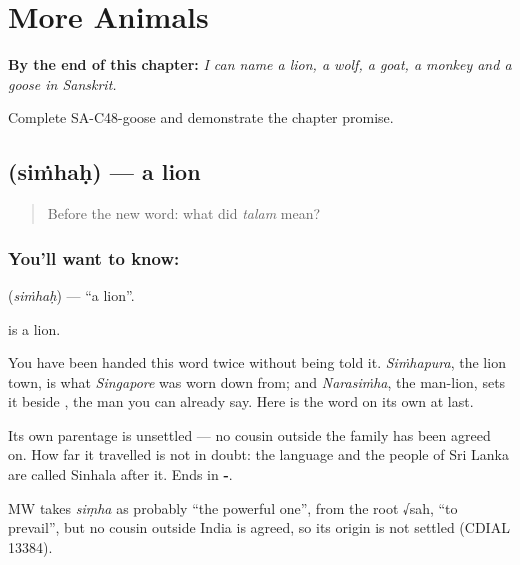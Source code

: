 
\chapter{More Animals}
\label{ch:sa-more-animals}

\begin{chapteropening}
\textbf{By the end of this chapter:} \emph{I can name a lion, a wolf, a goat, a monkey and a goose in Sanskrit.}

Complete SA-C48-goose and demonstrate the chapter promise.
\end{chapteropening}

\section[\texorpdfstring{\sk{सिंहः} (siṁhaḥ)}{सिंहः (siṁhaḥ)}]{ (siṁhaḥ) — a lion}

\label{lesson:SA-C48-lion}



\begin{quote}
Before the new word: what did \emph{talam} mean?
\end{quote}

\subsection*{You'll want to know: }
\textbf{} (\emph{siṁhaḥ}) — \textquotedblleft{}a lion\textquotedblright{}.

\textbf{} is a lion.

You have been handed this word twice without being told it. \emph{Siṁhapura}, the lion town, is what \emph{Singapore} was worn down from; and \emph{Narasiṁha}, the man-lion, sets it beside , the man you can already say. Here is the word on its own at last.

Its own parentage is unsettled — no cousin outside the family has been agreed on. How far it travelled is not in doubt: the language and the people of Sri Lanka are called Sinhala after it. Ends in \textbf{-}.

\begin{cousinweb}
MW takes \emph{siṃha} as probably \textquotedblleft{}the powerful one\textquotedblright{}, from the root √sah, \textquotedblleft{}to prevail\textquotedblright{}, but no cousin outside India is agreed, so its origin is not settled (CDIAL 13384).
\end{cousinweb}

